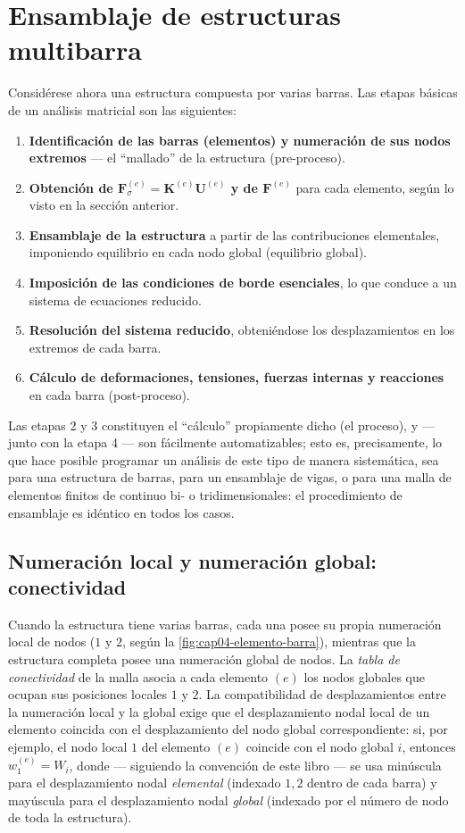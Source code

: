 \section{Ensamblaje de estructuras multibarra}
\label{sec:cap04-ensamblaje}

Considérese ahora una estructura compuesta por varias barras. Las etapas básicas de un análisis matricial son las siguientes:
\begin{enumerate}[leftmargin=1.6em]
  \item \textbf{Identificación de las barras (elementos) y numeración de sus nodos extremos} --- el ``mallado'' de la estructura (pre-proceso).
  \item \textbf{Obtención de $\mathbf{F}_\sigma^{(e)} = \mathbf{K}^{(e)}\mathbf{U}^{(e)}$ y de $\mathbf{F}^{(e)}$} para cada elemento, según lo visto en la sección anterior.
  \item \textbf{Ensamblaje de la estructura} a partir de las contribuciones elementales, imponiendo equilibrio en cada nodo global (equilibrio global).
  \item \textbf{Imposición de las condiciones de borde esenciales}, lo que conduce a un sistema de ecuaciones reducido.
  \item \textbf{Resolución del sistema reducido}, obteniéndose los desplazamientos en los extremos de cada barra.
  \item \textbf{Cálculo de deformaciones, tensiones, fuerzas internas y reacciones} en cada barra (post-proceso).
\end{enumerate}
Las etapas 2 y 3 constituyen el ``cálculo'' propiamente dicho (el proceso), y --- junto con la etapa 4 --- son fácilmente automatizables; esto es, precisamente, lo que hace posible programar un análisis de este tipo de manera sistemática, sea para una estructura de barras, para un ensamblaje de vigas, o para una malla de elementos finitos de continuo bi- o tridimensionales: el procedimiento de ensamblaje es idéntico en todos los casos.

\subsection{Numeración local y numeración global: conectividad}

Cuando la estructura tiene varias barras, cada una posee su propia numeración local de nodos ($1$ y $2$, según la \cref{fig:cap04-elemento-barra}), mientras que la estructura completa posee una numeración global de nodos. La \emph{tabla de conectividad} de la malla asocia a cada elemento $(e)$ los nodos globales que ocupan sus posiciones locales $1$ y $2$. La compatibilidad de desplazamientos entre la numeración local y la global exige que el desplazamiento nodal local de un elemento coincida con el desplazamiento del nodo global correspondiente: si, por ejemplo, el nodo local $1$ del elemento $(e)$ coincide con el nodo global $i$, entonces $w_1^{(e)} = W_i$, donde --- siguiendo la convención de este libro --- se usa minúscula para el desplazamiento nodal \emph{elemental} (indexado $1,2$ dentro de cada barra) y mayúscula para el desplazamiento nodal \emph{global} (indexado por el número de nodo de toda la estructura).

